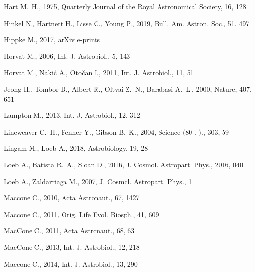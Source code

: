 \documentclass[crop]{CSLB}
\begin{document}
\begin{thebibliography}{90}
Hart M.~H., 1975, Quarterly Journal of the Royal Astronomical Society, 16, 128

Hinkel N., Hartnett H., Lisse C., Young P., 2019, Bull. Am. Astron. Soc., 51,
  497

Hippke M., 2017, arXiv e-prints

Horvat M., 2006, Int. J. Astrobiol., 5, 143

Horvat M., Naki{\'{c}} A., Oto{\v{c}}an I., 2011, Int. J. Astrobiol., 11, 51

Jeong H., Tombor B., Albert R., Oltvai Z.~N., Barabasi A.~L., 2000, Nature,
  407, 651

Lampton M., 2013, Int. J. Astrobiol., 12, 312

Lineweaver C.~H., Fenner Y., Gibson B.~K., 2004, Science (80-. )., 303, 59

Lingam M., Loeb A., 2018, Astrobiology, 19, 28

Loeb A., Batista R.~A., Sloan D., 2016, J. Cosmol. Astropart. Phys., 2016, 040

Loeb A., Zaldarriaga M., 2007, J. Cosmol. Astropart. Phys., 1

Maccone C., 2010, Acta Astronaut., 67, 1427

Maccone C., 2011, Orig. Life Evol. Biosph., 41, 609

MacCone C., 2011, Acta Astronaut., 68, 63

MacCone C., 2013, Int. J. Astrobiol., 12, 218

Maccone C., 2014{}, Int. J. Astrobiol., 13, 290


\end{thebibliography}
\end{document}
